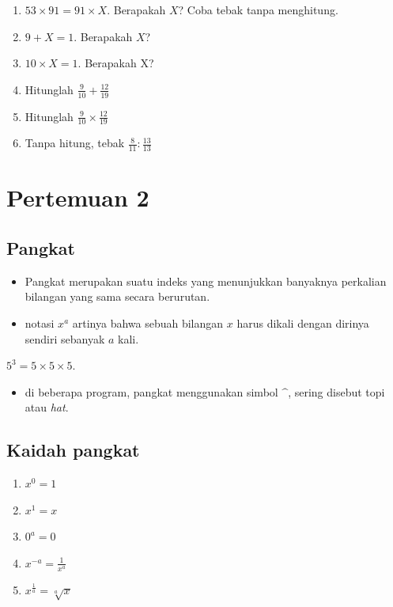 \documentclass[
  letterpaper,
  DIV=11,
  numbers=noendperiod]{scrartcl}
\providecommand{\tightlist}{%
  \setlength{\itemsep}{0pt}\setlength{\parskip}{0pt}}\usepackage{longtable,booktabs,array}
\begin{document}
\begin{enumerate}
\def\labelenumi{\arabic{enumi}.}
\item
  \(53 \times 91 = 91 \times X\). Berapakah \(X\)? Coba tebak tanpa
  menghitung.
\item
  \(9+X=1\). Berapakah \(X\)?
\item
  \(10 \times X = 1\). Berapakah X?
\item
  Hitunglah \(\frac{9}{10}+\frac{12}{19}\)
\item
  Hitunglah \(\frac{9}{10} \times \frac{12}{19}\)
\item
  Tanpa hitung, tebak \(\frac{8}{11} : \frac{13}{13}\)
\end{enumerate}

\hypertarget{pertemuan-2}{%
\section{Pertemuan 2}\label{pertemuan-2}}

\hypertarget{pangkat}{%
\subsection{Pangkat}\label{pangkat}}

\begin{itemize}
\item
  Pangkat merupakan suatu indeks yang menunjukkan banyaknya perkalian
  bilangan yang sama secara berurutan.
\item
  notasi \(x^a\) artinya bahwa sebuah bilangan \(x\) harus dikali dengan
  dirinya sendiri sebanyak \(a\) kali.
\end{itemize}

\(5^3=5 \times 5 \times 5\).

\begin{itemize}
\tightlist
\item
  di beberapa program, pangkat menggunakan simbol \(\^\), sering disebut
  topi atau \emph{hat}.
\end{itemize}

\hypertarget{kaidah-pangkat}{%
\subsection{Kaidah pangkat}\label{kaidah-pangkat}}

\begin{enumerate}
\def\labelenumi{\arabic{enumi}.}
\tightlist
\item
  \(x^0=1\)
\item
  \(x^1=x\)
\item
  \(0^a=0\)
\item
  \(x^{-a}=\frac{1}{x^a}\)
\item
  \(x^{\frac{1}{a}}=\sqrt[a]{x}\)
\end{enumerate}
\end{document}
